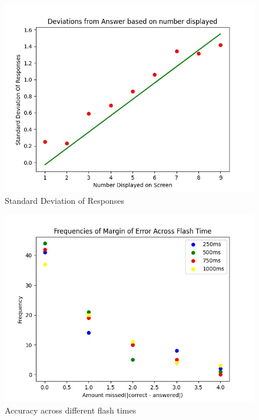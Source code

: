 \documentclass[12pt]{article}
\begin{document}
\begin{figure} [p]
\centering
\includegraphics[scale=0.4]{regression.jpg}
\caption{Standard Deviation of Responses}
\end{figure}

\begin{figure} [p]
\centering
\includegraphics[scale=0.4]{reaction.jpg}
\caption{Accuracy across different flash times}
\end{figure}
\end{document}

